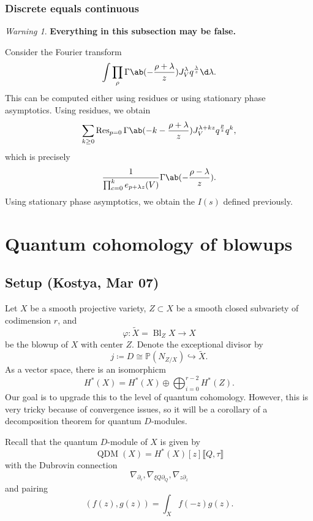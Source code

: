 \documentclass[leqno, openany]{memoir}
\theoremstyle{definition}
\theoremstyle{remark}
\newtheorem{warn}[thm]{Warning}
\theoremstyle{plain}
\theoremstyle{definition}
\theoremstyle{remark}
\renewcommand{\P}{\mathbb{P}}
\newcommand{\on}[1]{\operatorname{#1}}
\newcommand{\wt}[1]{\widetilde{#1}}
\DeclareMathOperator{\Bl}{Bl}
\DeclareMathOperator{\QDM}{QDM}
\begin{document}
\subsection{Discrete equals continuous}%
\label{sub:Discrete equals continuous}

\begin{warn}
    \textbf{Everything in this subsection may be false.}
\end{warn}

Consider the Fourier transform
\[ \int \prod_{\rho} \Gamma\ab(-\frac{\rho + \lambda}{z}) J_V^\lambda q^{\frac{\lambda}{z}} \d \lambda. \]
This can be computed either using residues or using stationary phase asymptotics. Using residues, we obtain
\begin{align*}
    \sum_{k \geq 0} \on{Res}_{p=0} \Gamma\ab(-k-\frac{\rho + \lambda}{z}) J_V^{\lambda + kz} q^{\frac{p}{z}} q^k,
\end{align*}
which is precisely
\[ \frac{1}{\prod_{c=0}^k e_{p+\lambda z}(V)} \Gamma\ab(-\frac{\rho-\lambda}{z}). \]
Using stationary phase asymptotics, we obtain the $I(s)$ defined previously.


\chapter{Quantum cohomology of blowups}%
\label{cha:Quantum cohomology of blowups}

\section{Setup (Kostya, Mar 07)}%
\label{sec:Setup}

Let $X$ be a smooth projective variety, $Z \subset X$ be a smooth closed subvariety of codimension $r$, and
\[ \varphi \colon \wt{X} = \Bl_Z X \to X \]
be the blowup of $X$ with center $Z$. Denote the exceptional divisor by
\[ j \coloneqq D \cong \P(N_{Z/X}) \hookrightarrow \wt{X}. \]
As a vector space, there is an isomorphicm
\[ H^*(X) = H^*(X) \oplus \bigoplus_{i=0}^{r-2} H^*(Z). \]
Our goal is to upgrade this to the level of quantum cohomology. However, this is very tricky because of convergence issues, so it will be a corollary of a decomposition theorem for quantum $D$-modules.

Recall that the quantum $D$-module of $X$ is given by
\[ \QDM(X) = H^*(X)[z] \llbracket Q, \tau \rrbracket \]
with the Dubrovin connection 
\[ \nabla_{\partial_{\tau}}, \nabla_{\xi Q \partial_Q}, \nabla_{z \partial_z} \]
and pairing
\[ (f(z), g(z)) = \int_X f(-z) g(z). \]
\end{document}
